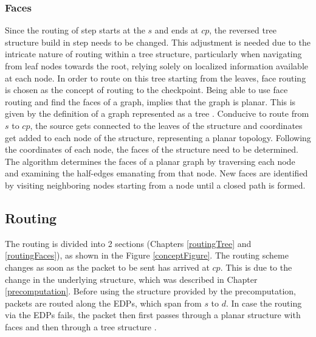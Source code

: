 \documentclass[a4paper,UKenglish,cleveref, autoref, thm-restate,dvipsnames]{lipics-v2021}
\begin{document}
\subsubsection{Faces}
\label{precompFace}
Since the routing of step  starts at the $s$ and ends at $cp$, the reversed tree structure build in step  needs to be changed. 
This adjustment is needed due to the intricate nature of routing within a tree structure, particularly when navigating from leaf nodes towards the root, relying solely on localized information available at each node.
In order to route on this tree starting from the leaves, face routing is chosen as the concept of routing to the checkpoint. 
Being able to use face routing and find the faces of a graph, implies that the graph is planar. 
This is given by the definition of a graph represented as a tree \cite{treeIsPlanar}.
Conducive to route from $s$ to $cp$, the source gets connected to the leaves of the structure and coordinates get added to each node of the structure, representing a planar topology.
Following the coordinates of each node, the faces of the structure need to be determined.
The algorithm determines the faces of a planar graph by traversing each node and examining the half-edges emanating from that node. 
New faces are identified by visiting neighboring nodes starting from a node until a closed path is formed.

\subsection{Routing}
The routing is divided into 2 sections (Chapters \ref{routingTree} and \ref{routingFaces}), as shown in the Figure \ref{conceptFigure}. The routing scheme changes as soon as the packet to be sent has arrived at $cp$. This is due to the change in the underlying structure, which was described in Chapter \ref{precomputation}.
Before using the structure provided by the precomputation, packets are routed along the EDPs, which span from $s$ to $d$.
In case the routing via the EDPs fails, the packet then first passes through a planar structure with faces  and then through a tree structure .
\end{document}
